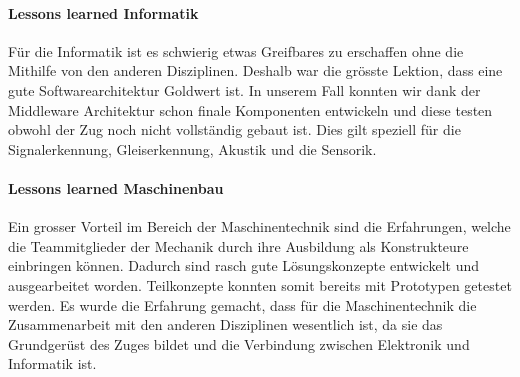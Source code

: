 \documentclass[../../main.tex]{subfiles}
\begin{document}
\paragraph{Lessons learned Informatik}
Für die Informatik ist es schwierig etwas Greifbares zu erschaffen ohne die Mithilfe von den anderen Disziplinen. Deshalb
war die grösste Lektion, dass eine gute Softwarearchitektur Goldwert ist. In unserem Fall konnten wir dank der
Middleware Architektur schon finale Komponenten entwickeln und diese testen obwohl der Zug noch nicht vollständig gebaut
ist. Dies gilt speziell für die Signalerkennung, Gleiserkennung, Akustik und die Sensorik.

\paragraph{Lessons learned Maschinenbau}
Ein grosser Vorteil im Bereich der Maschinentechnik sind die Erfahrungen, welche die Teammitglieder der Mechanik durch ihre Ausbildung als Konstrukteure einbringen können. Dadurch sind rasch gute Lösungskonzepte entwickelt und ausgearbeitet worden. Teilkonzepte konnten somit bereits mit Prototypen getestet werden. Es wurde die Erfahrung gemacht, dass für die Maschinentechnik die Zusammenarbeit mit den anderen Disziplinen wesentlich ist, da sie das Grundgerüst des Zuges bildet und die Verbindung zwischen Elektronik und Informatik ist.
\end{document}
